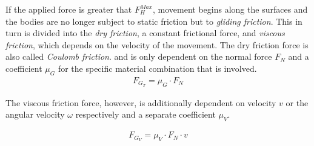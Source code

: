\documentclass[10pt,a4paper]{article}
\begin{document}
If the applied force is greater that $F_H^{Max}$, movement begins along the surfaces and the bodies
are no longer subject to static friction but to \textit{gliding friction}.
This in turn is divided into the \textit {dry friction}, a constant frictional force,
and \textit{viscous friction}, which depends on the velocity of the movement.
The dry friction force is also called \textit{Coulomb friction}.
and is only dependent on the normal force $F_N$ and a coefficient $\mu_G$ for the
specific material combination that is involved.
\begin{eqnarray}
    F_{G_T} = \mu_G \cdot F_N
\end{eqnarray}

The viscous friction force, however, is additionally dependent on velocity $v$ or the
angular velocity $\omega$ respectively and a separate coefficient $\mu_V$.

\begin{eqnarray}
    F_{G_V} = \mu_V \cdot F_N \cdot v
\end{eqnarray}
\end{document}

